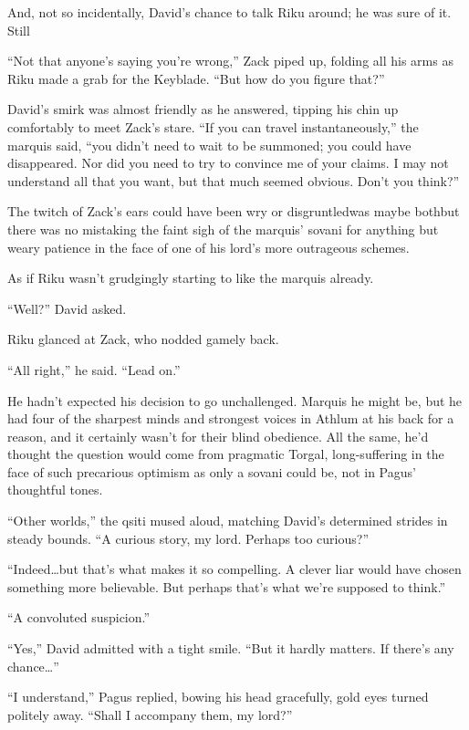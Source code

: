 And, not so incidentally, David's chance to talk Riku around; he was sure of it. Still\textemdash 

``Not that anyone's saying you're wrong,'' Zack piped up, folding all his arms as Riku made a grab for the Keyblade. ``But how do you figure that?''

David's smirk was almost friendly as he answered, tipping his chin up comfortably to meet Zack's stare. ``If you can travel instantaneously,'' the marquis said, ``you didn't need to wait to be summoned; you could have disappeared. Nor did you need to try to convince me of your claims. I may not understand all that you want, but that much seemed obvious. Don't you think?''

The twitch of Zack's ears could have been wry or disgruntled\textemdash was maybe both\textemdash but there was no mistaking the faint sigh of the marquis' sovani for anything but weary patience in the face of one of his lord's more outrageous schemes.

As if Riku wasn't grudgingly starting to like the marquis already.

``Well?'' David asked.

Riku glanced at Zack, who nodded gamely back.

``All right,'' he said. ``Lead on.''


\scenechange


He hadn't expected his decision to go unchallenged. Marquis he might be, but he had four of the sharpest minds and strongest voices in Athlum at his back for a reason, and it certainly wasn't for their blind obedience. All the same, he'd thought the question would come from pragmatic Torgal, long-suffering in the face of such precarious optimism as only a sovani could be, not in Pagus' thoughtful tones.

``Other worlds,'' the qsiti mused aloud, matching David's determined strides in steady bounds. ``A curious story, my lord. Perhaps too curious?''

``Indeed\ldots but that's what makes it so compelling. A clever liar would have chosen something more believable. But perhaps that's what we're supposed to think.''

``A convoluted suspicion.''

``Yes,'' David admitted with a tight smile. ``But it hardly matters. If there's any chance\ldots ''

``I understand,'' Pagus replied, bowing his head gracefully, gold eyes turned politely away. ``Shall I accompany them, my lord?''


